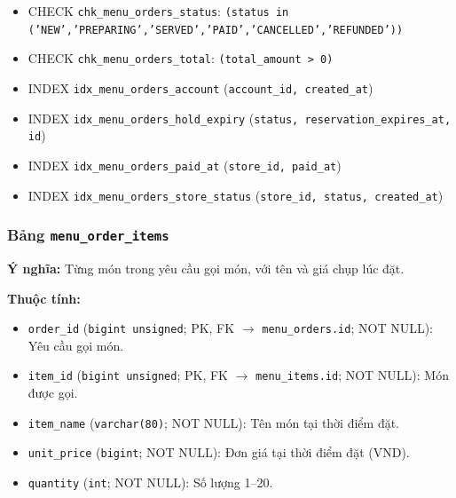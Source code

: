 \begin{itemize}
\item CHECK \texttt{chk\_menu\_orders\_status}: \texttt{(status in ('NEW','PREPARING','SERVED','PAID','CANCELLED','REFUNDED'))}

\item CHECK \texttt{chk\_menu\_orders\_total}: \texttt{(total\_amount > 0)}

\item INDEX \texttt{idx\_menu\_orders\_account} (\texttt{account\_id, created\_at})

\item INDEX \texttt{idx\_menu\_orders\_hold\_expiry} (\texttt{status, reservation\_expires\_at, id})

\item INDEX \texttt{idx\_menu\_orders\_paid\_at} (\texttt{store\_id, paid\_at})

\item INDEX \texttt{idx\_menu\_orders\_store\_status} (\texttt{store\_id, status, created\_at})

\end{itemize}

\subsubsection{Bảng \texttt{menu\_order\_items}}

\textbf{Ý nghĩa:} Từng món trong yêu cầu gọi món, với tên và giá chụp lúc đặt.\par

\textbf{Thuộc tính:}

\begin{itemize}

\item \texttt{order\_id} (\texttt{bigint unsigned}; PK, FK $\rightarrow$ \texttt{menu\_orders.id}; NOT NULL): Yêu cầu gọi món.

\item \texttt{item\_id} (\texttt{bigint unsigned}; PK, FK $\rightarrow$ \texttt{menu\_items.id}; NOT NULL): Món được gọi.

\item \texttt{item\_name} (\texttt{varchar(80)}; NOT NULL): Tên món tại thời điểm đặt.

\item \texttt{unit\_price} (\texttt{bigint}; NOT NULL): Đơn giá tại thời điểm đặt (VND).

\item \texttt{quantity} (\texttt{int}; NOT NULL): Số lượng 1–20.

\end{itemize}

